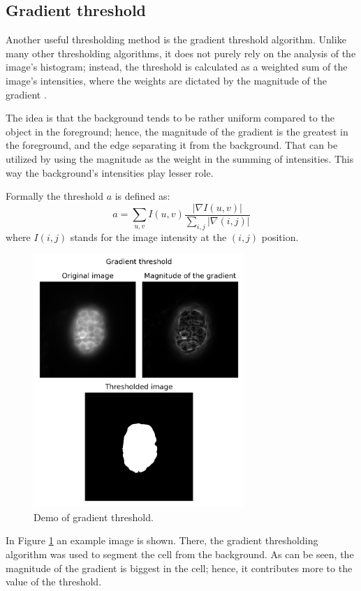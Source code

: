 \documentclass[
  digital,     %
  oneside,     %
  nosansbold,  %
  nocolorbold, %
  lof,         %
  lot,         %
]{fithesis4}
\begin{document}
\subsection{Gradient threshold}

Another useful thresholding method is the gradient threshold algorithm. Unlike
many other thresholding algorithms, it does not purely rely on the analysis of
the image's histogram; instead, the threshold is calculated as a weighted sum of
the image's intensities, where the weights are dictated by the magnitude of the
gradient \cite{pb130}.

The idea is that the background tends to be rather uniform compared to the
object in the foreground; hence, the magnitude of the gradient is the greatest
in the foreground, and the edge separating it from the background. That can be
utilized by using the magnitude as the weight in the summing of intensities.
This way the background's intensities play lesser role.

Formally the threshold $a$ is defined as:
$$a = \sum_{u, v} I(u, v) \frac{|\nabla I(u, v)|}{\sum_{i, j} |\nabla(i,j)|}$$
where $I(i, j)$ stands for the image intensity at the $(i, j)$ position.

\begin{figure}
    \begin{center}
        \includegraphics[width=8cm]{"resources/demo-gradient-threshold.png"}
    \end{center}
    \caption{Demo of gradient threshold.}
    \label{fig:demo_grad_thresh}
\end{figure}

In Figure \ref{fig:demo_grad_thresh} an example image is shown. There, the
gradient thresholding algorithm was used to segment the cell from the
background. As can be seen, the magnitude of the gradient is biggest in the
cell; hence, it contributes more to the value of the threshold.
\end{document}
